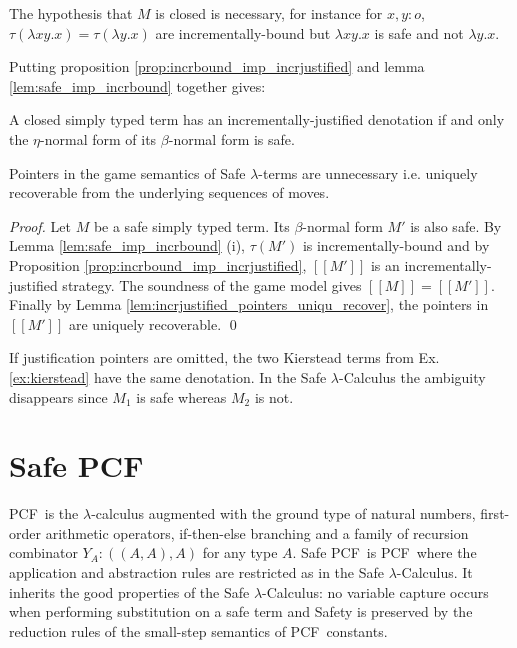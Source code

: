\documentclass{llncs}
\newcommand{\sem}[1]{{[\![ #1 ]\!]}}
\newcommand\pcf{\textsf{PCF}}
\begin{document}
The hypothesis that $M$ is closed is necessary, for instance for $x,y:o$, $\tau(\lambda x y .x) = \tau(\lambda y . x)$
are incrementally-bound but $\lambda x y .x$ is safe and not $\lambda y . x$.



Putting proposition \ref{prop:incrbound_imp_incrjustified} and lemma
\ref{lem:safe_imp_incrbound} together gives:
\begin{corollary}
A closed simply typed term has an
incrementally-justified denotation if and only the $\eta$-normal form of
its $\beta$-normal form is safe.
\end{corollary}

\begin{theorem}
\label{thm:safe_ptr_recoverable} Pointers in the game semantics of
Safe $\lambda$-terms are unnecessary i.e. uniquely recoverable from the underlying sequences of moves.
\end{theorem}
\begin{proof}
Let $M$ be a safe simply typed term. Its $\beta$-normal form $M'$
is also safe. By Lemma \ref{lem:safe_imp_incrbound}
(i), $\tau(M')$ is incrementally-bound and by Proposition
\ref{prop:incrbound_imp_incrjustified}, $\sem{M'}$ is an
incrementally-justified strategy. The soundness of the game model gives $\sem{M} = \sem{M'}$.
Finally by Lemma \ref{lem:incrjustified_pointers_uniqu_recover}, the pointers in
$\sem{M'}$ are uniquely recoverable.
\qed
\end{proof}

\begin{example} If justification pointers are omitted, the two Kierstead terms from Ex. \ref{ex:kierstead} have
the same denotation. In the Safe $\lambda$-Calculus the ambiguity disappears since $M_1$ is safe whereas $M_2$ is not.
\end{example}


\section{Safe \pcf}

\pcf\ is the $\lambda$-calculus augmented with the ground type of natural numbers, first-order arithmetic operators, if-then-else branching
and a family of recursion combinator $Y_A : ((A,A),A)$ for any type $A$.
Safe \pcf\ is \pcf\ where the application and abstraction rules are restricted as in the Safe $\lambda$-Calculus.
It inherits the good properties of the Safe $\lambda$-Calculus: no variable capture occurs when performing substitution on a safe term and Safety is preserved by the reduction rules of the small-step semantics of \pcf\ constants.
\end{document}
